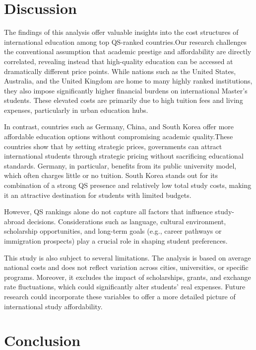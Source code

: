 \documentclass[
  letterpaper,
  DIV=11,
  numbers=noendperiod]{scrartcl}
\begin{document}
\section{Discussion}\label{discussion}

The findings of this analysis offer valuable insights into the cost
structures of international education among top QS-ranked countries.Our
research challenges the conventional assumption that academic prestige
and affordability are directly correlated, revealing instead that
high-quality education can be accessed at dramatically different price
points. While nations such as the United States, Australia, and the
United Kingdom are home to many highly ranked institutions, they also
impose significantly higher financial burdens on international Master's
students. These elevated costs are primarily due to high tuition fees
and living expenses, particularly in urban education hubs.

In contrast, countries such as Germany, China, and South Korea offer
more affordable education options without compromising academic
quality.These countries show that by setting strategic prices,
governments can attract international students through strategic pricing
without sacrificing educational standards. Germany, in particular,
benefits from its public university model, which often charges little or
no tuition. South Korea stands out for its combination of a strong QS
presence and relatively low total study costs, making it an attractive
destination for students with limited budgets.

However, QS rankings alone do not capture all factors that influence
study-abroad decisions. Considerations such as language, cultural
environment, scholarship opportunities, and long-term goals (e.g.,
career pathways or immigration prospects) play a crucial role in shaping
student preferences.

This study is also subject to several limitations. The analysis is based
on average national costs and does not reflect variation across cities,
universities, or specific programs. Moreover, it excludes the impact of
scholarships, grants, and exchange rate fluctuations, which could
significantly alter students' real expenses. Future research could
incorporate these variables to offer a more detailed picture of
international study affordability.

\section{Conclusion}\label{conclusion}
\end{document}
